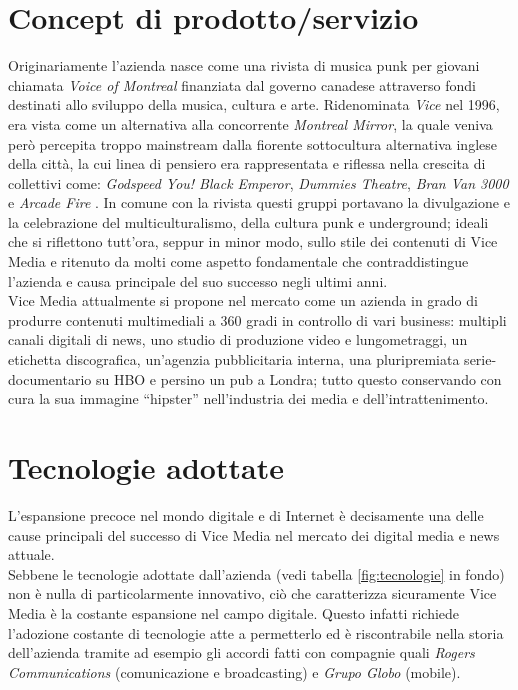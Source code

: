 \documentclass[a4paper, 11pt]{article}
\begin{document}
\section*{Concept di prodotto/servizio}
\par Originariamente l’azienda nasce come una rivista di musica punk per giovani chiamata \textit{Voice of Montreal} finanziata dal governo canadese attraverso fondi destinati allo sviluppo della musica, cultura e arte.
Ridenominata \textit{Vice} nel 1996, era vista come un alternativa alla concorrente \textit{Montreal Mirror}, la quale veniva però percepita troppo mainstream dalla fiorente sottocultura alternativa inglese della città, la cui linea di pensiero era rappresentata e riflessa nella crescita di collettivi come: \textit{Godspeed You! Black Emperor}, \textit{Dummies Theatre}, \textit{Bran Van 3000} e \textit{Arcade Fire} \cite{Mongaz}\cite{Mongaz2}. 
In comune con la rivista questi gruppi portavano la divulgazione e la celebrazione del multiculturalismo, della cultura punk e underground; ideali che si riflettono tutt’ora, seppur in minor modo, sullo stile dei contenuti di Vice Media e ritenuto da molti come aspetto fondamentale che contraddistingue l’azienda e causa principale del suo successo negli ultimi anni.\\
Vice Media attualmente si propone nel mercato come un azienda in grado di produrre contenuti multimediali a 360 gradi in controllo di vari business: multipli canali digitali di news, uno studio di produzione video e lungometraggi, un etichetta discografica, un’agenzia pubblicitaria interna, una pluripremiata serie-documentario su HBO e persino un pub a Londra; tutto questo conservando con cura la sua immagine “hipster” nell’industria dei media e dell’intrattenimento.

\newpage
\section*{Tecnologie adottate}
\par L'espansione precoce nel mondo digitale e di Internet è decisamente una delle cause principali del successo di Vice Media nel mercato dei digital media e news attuale.\\
Sebbene le tecnologie adottate dall'azienda (vedi tabella \ref{fig:tecnologie} in fondo) non è nulla di particolarmente innovativo, ciò che caratterizza sicuramente Vice Media è la costante espansione nel campo digitale. Questo infatti richiede l'adozione costante di tecnologie atte a permetterlo ed è riscontrabile nella storia dell'azienda tramite ad esempio gli accordi fatti con compagnie quali \textit{Rogers Communications} (comunicazione e broadcasting)  e \textit{Grupo Globo} (mobile).
\end{document}
